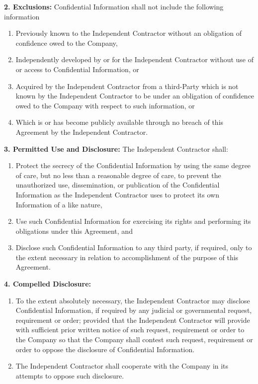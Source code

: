 \documentclass[12pt]{article}
\begin{document}
\vspace{0.5em}
\noindent
\textbf{2. Exclusions:} Confidential Information shall not include the following information
\begin{enumerate}
    \item[i.] Previously known to the Independent Contractor without an obligation of confidence owed to the Company,
    \item[ii.] Independently developed by or for the Independent Contractor without use of or access to Confidential Information, or
    \item[iii.] Acquired by the Independent Contractor from a third-Party which is not known by the Independent Contractor to be under an obligation of confidence owed to the Company with respect to such information, or
    \item[iv.] Which is or has become publicly available through no breach of this Agreement by the Independent Contractor.
\end{enumerate}

\vspace{0.5em}
\noindent
\textbf{3. Permitted Use and Disclosure:} The Independent Contractor shall:
\begin{enumerate}
    \item[i.] Protect the secrecy of the Confidential Information by using the same degree of care, but no less than a reasonable degree of care, to prevent the unauthorized use, dissemination, or publication of the Confidential Information as the Independent Contractor uses to protect its own Information of a like nature,
    \item[ii.] Use such Confidential Information for exercising its rights and performing its obligations under this Agreement, and
    \item[iii.] Disclose such Confidential Information to any third party, if required, only to the extent necessary in relation to accomplishment of the purpose of this Agreement.
\end{enumerate}

\vspace{0.5em}
\noindent
\textbf{4. Compelled Disclosure:}
\begin{enumerate}
    \item[i.] To the extent absolutely necessary, the Independent Contractor may disclose Confidential Information, if required by any judicial or governmental request, requirement or order; provided that the Independent Contractor will provide with sufficient prior written notice of such request, requirement or order to the Company so that the Company shall contest such request, requirement or order to oppose the disclosure of Confidential Information.
    \item[ii.] The Independent Contractor shall cooperate with the Company in its attempts to oppose such disclosure.
\end{enumerate}
\end{document}
